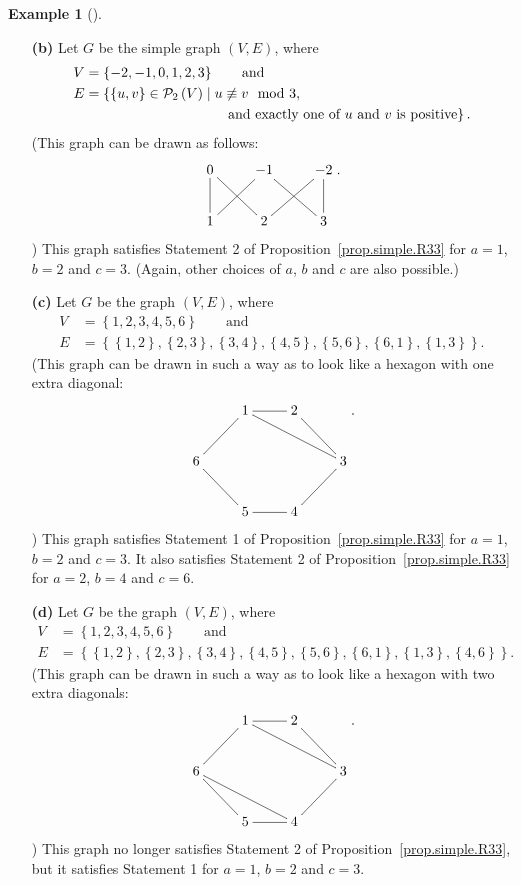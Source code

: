 \documentclass[numbers=enddot,12pt,final,onecolumn,notitlepage]{scrartcl}%
\makeatletter
\theoremstyle{definition}
\newtheorem{exam}[theo]{Example}
\newenvironment{example}[1][]
{\begin{exam}[#1]\begin{leftbar}}
{\end{leftbar}\end{exam}}
\newcommand{\powset}[2][]{\ifthenelse{\equal{#2}{}}{\mathcal{P}\left(#1\right)}{\mathcal{P}_{#1}\left(#2\right)}}
\newcommand{\set}[1]{\left\{ #1 \right\}}
\newcommand{\tup}[1]{\left( #1 \right)}
\newcommand{\are}{\ar@{-}}
\makeatother
\begin{document}
\begin{example}
\begin{enumerate}
\item[\textbf{(b)}] Let $G$ be the simple graph $\tup{V, E}$, where
\begin{align*}
V &= \set{-2, -1, 0, 1, 2, 3} \qquad \text{and} \\
E &= \left\{\set{u,v} \in \powset[2]{V} \mid
           u \not\equiv v \mod 3, \right. \\
  & \qquad \qquad \qquad \qquad \qquad
        \left. \text{and exactly one of $u$ and $v$ is positive}
                \right\} .
\end{align*}
(This graph can be drawn as follows:
\begin{align*}
\xymatrix{
0 \are[d] \are[dr] & -1 \are[dl] \are[dr] & -2 \are[dl] \are[d] \\
1 & 2 & 3
} .
\end{align*}
)
This graph satisfies Statement 2 of Proposition~\ref{prop.simple.R33}
for $a=1$, $b=2$ and $c=3$. (Again, other choices of $a$, $b$ and $c$
are also possible.)

\item[\textbf{(c)}] Let $G$ be the graph $\tup{V, E}$, where
\begin{align*}
V &= \set{1, 2, 3, 4, 5, 6} \qquad \text{and} \\
E &= \set{\set{1,2}, \set{2,3}, \set{3,4}, \set{4,5}, \set{5,6},
          \set{6,1}, \set{1,3}} .
\end{align*}
(This graph can be drawn in such a way as to look like a hexagon with
one extra diagonal:
\begin{align*}
\xymatrix{
& 1 \are[r] \are[rrd] & 2 \are[rd] \\
6 \are[ru] & & & 3 \are[ld] \\
& 5 \are[lu] & 4 \are[l]
} .
\end{align*}
)
This graph satisfies Statement 1 of Proposition~\ref{prop.simple.R33}
for $a=1$, $b=2$ and $c=3$. It also satisfies Statement 2 of
Proposition~\ref{prop.simple.R33} for $a=2$, $b=4$ and $c=6$.

\item[\textbf{(d)}] Let $G$ be the graph $\tup{V, E}$, where
\begin{align*}
V &= \set{1, 2, 3, 4, 5, 6} \qquad \text{and} \\
E &= \set{\set{1,2}, \set{2,3}, \set{3,4}, \set{4,5}, \set{5,6},
          \set{6,1}, \set{1,3}, \set{4,6}} .
\end{align*}
(This graph can be drawn in such a way as to look like a hexagon with
two extra diagonals:
\begin{align*}
\xymatrix{
& 1 \are[r] \are[rrd] & 2 \are[rd] \\
6 \are[ru] \are[rrd] & & & 3 \are[ld] \\
& 5 \are[lu] & 4 \are[l]
} .
\end{align*}
)
This graph no longer satisfies Statement 2 of
Proposition~\ref{prop.simple.R33}, but it satisfies Statement 1
for $a=1$, $b=2$ and $c=3$.


\end{enumerate}
\end{example}
\end{document}
